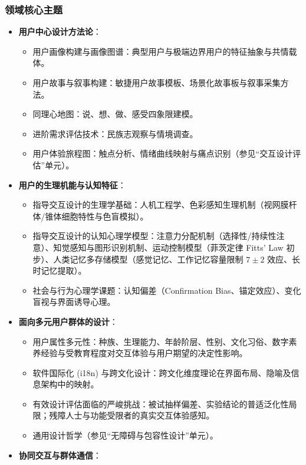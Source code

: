 \subsubsection{领域核心主题}
\begin{itemize}
    \item \textbf{用户中心设计方法论}：
    \begin{itemize}
        \item 用户画像构建与画像图谱：典型用户与极端边界用户的特征抽象与共情载体。
        \item 用户故事与叙事构建：敏捷用户故事模板、场景化故事板与叙事采集方法。
        \item 同理心地图：说、想、做、感受四象限建模。
        \item 进阶需求评估技术：民族志观察与情境调查。
        \item 用户体验旅程图：触点分析、情绪曲线映射与痛点识别（参见“交互设计评估”单元）。
    \end{itemize}
    \item \textbf{用户的生理机能与认知特征}：
    \begin{itemize}
        \item 指导交互设计的生理学基础：人机工程学、色彩感知生理机制（视网膜杆体/锥体细胞特性与色盲模拟）。
        \item 指导交互设计的认知心理学模型：注意力分配机制（选择性/持续性注意）、知觉感知与图形识别机制、运动控制模型（菲茨定律 Fitts' Law 初步）、人类记忆多存储模型（感觉记忆、工作记忆容量限制 $7\pm2$ 效应、长时记忆提取）。
        \item 社会与行为心理学课题：认知偏差（Confirmation Bias、锚定效应）、变化盲视与界面诱导心理。
    \end{itemize}
    \item \textbf{面向多元用户群体的设计}：
    \begin{itemize}
        \item 用户属性多元性：种族、生理能力、年龄阶层、性别、文化习俗、数字素养经验与受教育程度对交互体验与用户期望的决定性影响。
        \item 软件国际化 (i18n) 与跨文化设计：跨文化维度理论在界面布局、隐喻及信息架构中的映射。
        \item 有效设计评估面临的严峻挑战：被试抽样偏差、实验结论的普适泛化性局限；残障人士与功能受限者的真实交互体验感知。
        \item 通用设计哲学（参见“无障碍与包容性设计”单元）。
    \end{itemize}
    \item \textbf{协同交互与群体通信}：

\end{itemize}
